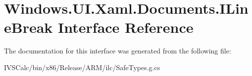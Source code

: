\hypertarget{interface_windows_1_1_u_i_1_1_xaml_1_1_documents_1_1_i_line_break}{}\section{Windows.\+U\+I.\+Xaml.\+Documents.\+I\+Line\+Break Interface Reference}
\label{interface_windows_1_1_u_i_1_1_xaml_1_1_documents_1_1_i_line_break}


The documentation for this interface was generated from the following file\+:\begin{DoxyCompactItemize}
\item 
I\+V\+S\+Calc/bin/x86/\+Release/\+A\+R\+M/ilc/Safe\+Types.\+g.\+cs\end{DoxyCompactItemize}

